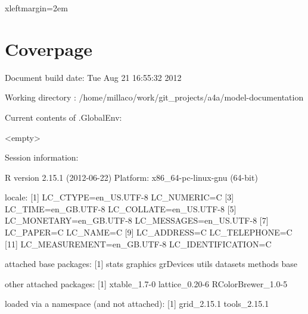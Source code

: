 \documentclass[a4paper,english]{article}
\begin{document}
 {xleftmargin=2em}
\renewenvironment{Schunk}{\vspace{\topsep}}{\vspace{\topsep}}

\section*{Coverpage}


\begin{Schunk}
\begin{Soutput}
Document build date: Tue Aug 21 16:55:32 2012 
\end{Soutput}
\begin{Soutput}
Working directory :
      /home/millaco/work/git_projects/a4a/model-documentation 
\end{Soutput}
\begin{Soutput}
Current contents of .GlobalEnv:
\end{Soutput}
\begin{Soutput}
     <empty>
\end{Soutput}
\begin{Soutput}
Session information:
\end{Soutput}
\begin{Soutput}
R version 2.15.1 (2012-06-22)
Platform: x86_64-pc-linux-gnu (64-bit)

locale:
 [1] LC_CTYPE=en_US.UTF-8       LC_NUMERIC=C              
 [3] LC_TIME=en_GB.UTF-8        LC_COLLATE=en_US.UTF-8    
 [5] LC_MONETARY=en_GB.UTF-8    LC_MESSAGES=en_US.UTF-8   
 [7] LC_PAPER=C                 LC_NAME=C                 
 [9] LC_ADDRESS=C               LC_TELEPHONE=C            
[11] LC_MEASUREMENT=en_GB.UTF-8 LC_IDENTIFICATION=C       

attached base packages:
[1] stats     graphics  grDevices utils     datasets  methods   base     

other attached packages:
[1] xtable_1.7-0       lattice_0.20-6     RColorBrewer_1.0-5

loaded via a namespace (and not attached):
[1] grid_2.15.1  tools_2.15.1
\end{Soutput}
\end{Schunk}
\end{document}
